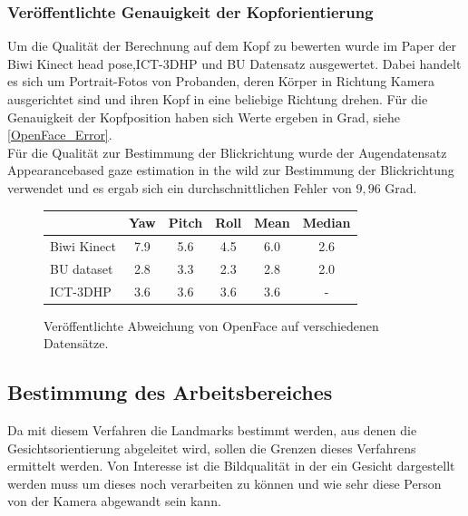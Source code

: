 \subsubsection{Veröffentlichte Genauigkeit der Kopforientierung}
Um die Qualität der Berechnung auf dem Kopf zu bewerten wurde im Paper \cite{OpenFace} der \glqq Biwi Kinect head pose\grqq \cite{BIWI_database},\glqq ICT-3DHP\grqq \cite{ICT_database} und \glqq BU Datensatz\grqq \cite{BU_database} ausgewertet. Dabei handelt es sich um Portrait-Fotos von Probanden, deren Körper in Richtung Kamera ausgerichtet sind und ihren Kopf in eine beliebige Richtung drehen. Für die Genauigkeit der Kopfposition haben sich Werte ergeben in Grad, siehe \autoref{OpenFace_Error}.\\
Für die Qualität zur Bestimmung der Blickrichtung wurde der Augendatensatz \glqq Appearancebased gaze estimation in the wild\grqq \cite{database_Eye_old} zur Bestimmung der Blickrichtung verwendet und es ergab sich ein durchschnittlichen Fehler von $9,96$ Grad.
\begin{figure}[h]
	\centering
	\begin{tabular}{|l|c|c|c||c|c|}
		\hline
		&Yaw&Pitch&Roll&Mean&Median\\\hline
		Biwi Kinect&7.9&5.6&4.5&6.0&2.6\\\hline
		BU dataset&2.8&3.3&2.3&2.8&2.0\\\hline
		ICT-3DHP&3.6&3.6&3.6&3.6&-\\\hline
	\end{tabular}
	\caption{Veröffentlichte Abweichung von OpenFace auf verschiedenen Datensätze.\cite{OpenFace}}
	\label{OpenFace_Error}
\end{figure}
\subsection{Bestimmung des Arbeitsbereiches}
Da mit diesem Verfahren die Landmarks bestimmt werden, aus denen die Gesichtsorientierung abgeleitet wird, sollen die Grenzen dieses Verfahrens ermittelt werden. Von Interesse ist die Bildqualität in der ein Gesicht dargestellt werden muss um dieses noch verarbeiten zu können und wie sehr diese Person von der Kamera abgewandt sein kann.
